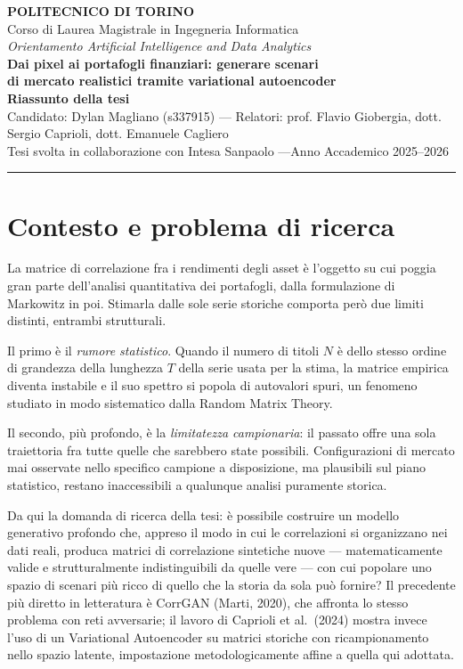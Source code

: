 \documentclass[11pt,a4paper]{article}
\begin{document}
\begin{center}
  {\Large\bfseries\color{polito} POLITECNICO DI TORINO}\\[0.35em]
  {\normalsize Corso di Laurea Magistrale in Ingegneria Informatica}\\
  {\small\itshape Orientamento Artificial Intelligence and Data Analytics}\\[1.1em]
  {\large\bfseries Dai pixel ai portafogli finanziari: generare scenari\\
   di mercato realistici tramite variational autoencoder}\\[0.7em]
  {\normalsize\bfseries Riassunto della tesi}\\[0.5em]
  {\small Candidato: Dylan Magliano (s337915) \quad---\quad
   Relatori: prof. Flavio Giobergia, dott. Sergio Caprioli,
   dott. Emanuele Cagliero}\\
  {\small Tesi svolta in collaborazione con Intesa Sanpaolo
   \quad---\quad Anno Accademico 2025--2026}
\end{center}

\vspace{0.5em}
\noindent\textcolor{rulegray}{\rule{\textwidth}{0.8pt}}

\section{Contesto e problema di ricerca}

La matrice di correlazione fra i rendimenti degli asset è l'oggetto su cui
poggia gran parte dell'analisi quantitativa dei portafogli, dalla
formulazione di Markowitz in poi. Stimarla dalle sole serie storiche
comporta però due limiti distinti, entrambi strutturali.

Il primo è il \emph{rumore statistico}. Quando il numero di titoli $N$ è dello
stesso ordine di grandezza della lunghezza $T$ della serie usata per la stima,
la matrice empirica diventa instabile e il suo spettro si popola di autovalori
spuri, un fenomeno studiato in modo sistematico dalla Random Matrix Theory.

Il secondo, più profondo, è la \emph{limitatezza campionaria}: il passato
offre una sola traiettoria fra tutte quelle che sarebbero state possibili.
Configurazioni di mercato mai osservate nello specifico campione a
disposizione, ma plausibili sul piano statistico, restano
inaccessibili a qualunque analisi puramente storica.

Da qui la domanda di ricerca della tesi: è possibile costruire un modello
generativo profondo che, appreso il modo in cui le correlazioni si organizzano
nei dati reali, produca matrici di correlazione sintetiche nuove ---
matematicamente valide e strutturalmente indistinguibili da quelle vere ---
con cui popolare uno spazio di scenari più ricco di quello che la storia da
sola può fornire? Il precedente più diretto in letteratura è CorrGAN
(Marti, 2020), che affronta lo stesso problema con reti avversarie; il lavoro
di Caprioli et al.\ (2024) mostra invece l'uso di un Variational Autoencoder
su matrici storiche con ricampionamento nello spazio latente, impostazione
metodologicamente affine a quella qui adottata.
\end{document}

